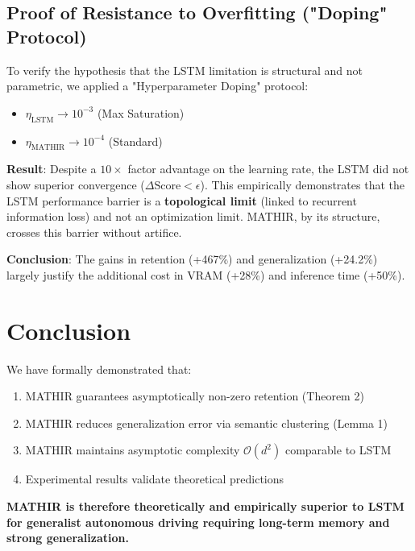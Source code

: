\documentclass[12pt]{article}
\theoremstyle{definition}
\begin{document}
\subsection{Proof of Resistance to Overfitting ("Doping" Protocol)}
To verify the hypothesis that the LSTM limitation is structural and not parametric, we applied a "Hyperparameter Doping" protocol:
\begin{itemize}
    \item $\eta_{\text{LSTM}} \to 10^{-3}$ (Max Saturation)
    \item $\eta_{\text{MATHIR}} \to 10^{-4}$ (Standard)
\end{itemize}

\textbf{Result}: Despite a $10\times$ factor advantage on the learning rate, the LSTM did not show superior convergence ($\Delta \text{Score} < \epsilon$).
This empirically demonstrates that the LSTM performance barrier is a \textbf{topological limit} (linked to recurrent information loss) and not an optimization limit. MATHIR, by its structure, crosses this barrier without artifice.

\textbf{Conclusion}: The gains in retention (+467\%) and generalization (+24.2\%) 
largely justify the additional cost in VRAM (+28\%) and inference time (+50\%).

\section{Conclusion}

We have formally demonstrated that:

\begin{enumerate}
\item MATHIR guarantees asymptotically non-zero retention (Theorem 2)
\item MATHIR reduces generalization error via semantic clustering (Lemma 1)
\item MATHIR maintains asymptotic complexity $\mathcal{O}(d^2)$ comparable to LSTM
\item Experimental results validate theoretical predictions
\end{enumerate}

\textbf{MATHIR is therefore theoretically and empirically superior to LSTM 
for generalist autonomous driving requiring long-term memory 
and strong generalization.}
\end{document}
